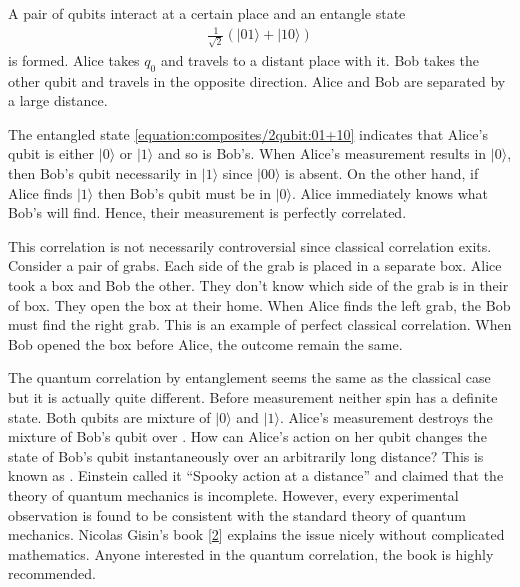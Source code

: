 \documentclass[letterpaper,10pt,english]{jupyterBook}
\begin{document}
\sphinxAtStartPar
A pair of qubits interact at a certain place and an entangle state
\begin{equation}\label{equation:composites/2qubit:01+10}
\begin{split}
\frac{1}{\sqrt{2}} \left(|01\rangle + |10\rangle\right)
\end{split}
\end{equation}
\sphinxAtStartPar
is formed.  Alice takes \(q_0\) and travels to a distant place with it. Bob takes the other qubit and travels in the opposite direction.  Alice and Bob are separated by a large distance.

\sphinxAtStartPar
The entangled state \eqref{equation:composites/2qubit:01+10} indicates that Alice’s qubit is either \(|0\rangle\) or \(|1\rangle\) and so is Bob’s.  When Alice’s measurement results in \(|0\rangle\), then Bob’s qubit necessarily in \(|1\rangle\) since \(|00\rangle\) is absent.  On the other hand, if Alice finds \(|1\rangle\) then Bob’s qubit must be in \(|0\rangle\).   Alice immediately knows what Bob’s will find.  Hence, their measurement is perfectly correlated.

\sphinxAtStartPar
This correlation is not necessarily controversial since classical correlation exits.  Consider a pair of grabs.  Each side of the grab is placed in a separate box.  Alice took a box and Bob the other.  They don’t know which side of the grab is in their of box.  They open the box at their home.  When Alice finds the left grab, the Bob must find the right grab.  This is an example of perfect classical correlation.  When Bob opened the box before Alice, the outcome remain the same.

\sphinxAtStartPar
The quantum correlation by entanglement seems the same as the classical case but it is actually quite different. Before measurement neither spin has a definite state.  Both qubits are mixture of \(|0\rangle\) and \(|1\rangle\).  Alice’s measurement destroys the mixture of Bob’s qubit  over .  How can Alice’s action on her qubit changes the state of Bob’s qubit instantaneously over an arbitrarily long distance?   This is known as .  Einstein called it “Spooky action at a distance” and claimed that the theory of quantum mechanics is incomplete.  However, every experimental observation is found to be consistent with the standard theory of quantum mechanics. Nicolas Gisin’s book {[}\hyperlink{cite.references:id20}{2}{]} explains the issue nicely without complicated mathematics. Anyone interested in the quantum correlation, the book is highly recommended.
\end{document}
